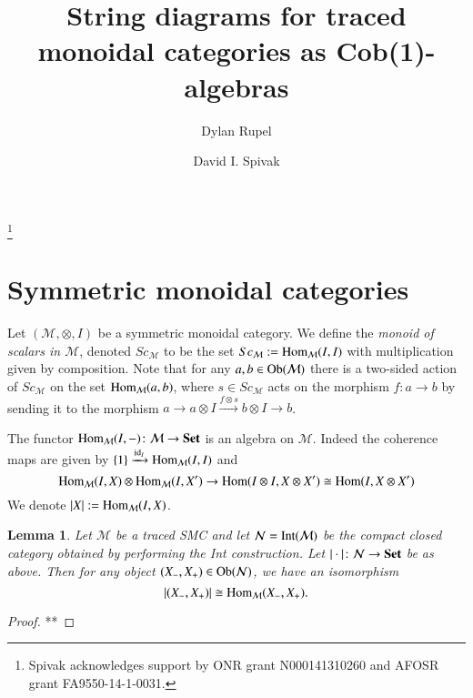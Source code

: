 \documentclass{amsart}
\def\tn{\textnormal}
\def\mc{\mathcal}
\def\Hom{\tn{Hom}}
\def\Ob{\tn{Ob}}
\def\to{\rightarrow}
\def\taking{\colon}
\def\iso{\cong}
\newcommand{\To}[1]{\xrightarrow{#1}}
\def\id{\tn{id}}
\def\Set{{\bf Set}}
\def\mcM{\mc{M}}
\def\mcN{\mc{N}}
\def\Int{\tn{Int}}
\newtheorem{lemma}[subsubsection]{Lemma}
\theoremstyle{remark}
\theoremstyle{definition}
\begin{document}
\title{String diagrams for traced monoidal categories as Cob(1)-algebras}

\author{Dylan Rupel}
\address{Northeastern University\\360 Huntington Ave.\\Boston, MA 02115}

\author{David I. Spivak}
\address{Massachusetts Institute of Technology\\77 Massachusetts Ave.\\Cambridge, MA 02139}

\thanks{Spivak acknowledges support by ONR grant N000141310260 and AFOSR grant FA9550-14-1-0031.}


\maketitle

\tableofcontents

\section{Symmetric monoidal categories}

Let $(\mcM,\otimes,I)$ be a symmetric monoidal category. We define the {\em monoid of scalars in $\mcM$}, denoted $Sc_\mcM$ to be the set $Sc_\mcM:=\Hom_\mcM(I,I)$ with multiplication given by composition. Note that for any $a,b\in\Ob(\mcM)$ there is a two-sided action of $Sc_\mcM$ on the set $\Hom_\mcM(a,b)$, where $s\in Sc_\mcM$ acts on the morphism $f\taking a\to b$ by sending it to the morphism $a\to a\otimes I\To{f\otimes s}b\otimes I\to b$.

The functor $\Hom_\mcM(I,-)\taking\mcM\to\Set$ is an algebra on $\mcM$. Indeed the coherence maps are given by $\{1\}\To{\id_I}\Hom_\mcM(I,I)$ and 
$$\Hom_\mcM(I,X)\otimes\Hom_\mcM(I,X')\to\Hom(I\otimes I,X\otimes X')\iso\Hom(I,X\otimes X')$$ 
We denote $|X|:=\Hom_\mcM(I,X)$.

\begin{lemma}

Let $\mcM$ be a traced SMC and let $\mcN=\Int(\mcM)$ be the compact closed category obtained by performing the Int construction. Let $|\cdot|\taking\mcN\to\Set$ be as above. Then for any object $(X_-,X_+)\in\Ob(\mcN)$, we have an isomorphism
$$|(X_-,X_+)|\iso\Hom_\mcM(X_-,X_+).$$

\end{lemma}

\begin{proof}

**

\end{proof}
\end{document}

